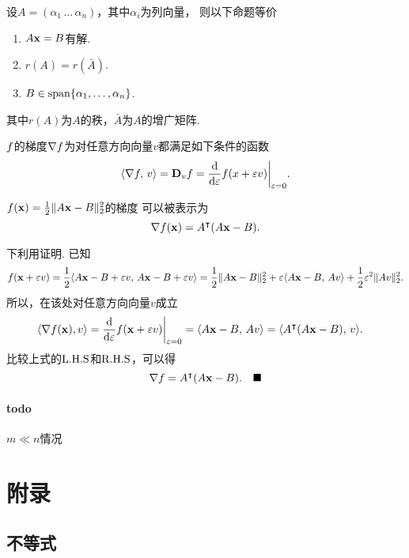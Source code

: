   \begin{thm}[可解性条件]
    设$A=(\alpha_1\,\dots\,\alpha_n)$，其中$\alpha_i$为列向量，
    则以下命题等价
    \begin{enumerate}
      \item $A\mathbf{x}=B$有解.
      \item $r(A) = r(\bar{A})$.
      \item $B\in\operatorname{span}\{\alpha_1,\dots,\alpha_n\}$.
    \end{enumerate}
    其中$r(A)$为$A$的秩，$\bar{A}$为$A$的增广矩阵.
  \end{thm}

  \begin{lemma}[梯度的定价定义]
    \label{lemma: 梯度的等价定义}
    $\mathnormal{f}$的梯度$\nabla\mathnormal{f}$为对任意方向向量$v$都满足如下条件的函数
    \[
      \langle\nabla\mathnormal{f},\,v\rangle = \textbf{D}_v\mathnormal{f} = \frac{\mathrm{d}}{\mathrm{d}\varepsilon}\mathnormal{f}(x+\varepsilon v)
      \bigg|_{\varepsilon=0}.
    \]
  \end{lemma}

  \begin{thm}
    $\mathnormal{f}(\mathbf{x}) = \frac{1}{2}\|A\mathbf{x}-B\|_2^2$的梯度
    可以被表示为
    \[
      \nabla\mathnormal{f}(\mathbf{x}) = A^\intercal(A\mathbf{x}-B).
    \]
  \end{thm}
  \proof
    下利用证明. 已知
    \[
      \mathnormal{f}(\textbf{x}+\varepsilon v) = \frac{1}{2}\langle A\mathbf{x}-B+\varepsilon v,\, A\mathbf{x}-B+\varepsilon v\rangle
      = \frac{1}{2}\|A\mathbf{x}-B\|_2^2 + \varepsilon\langle A\mathbf{x}-B,\,Av \rangle + \frac{1}{2}\varepsilon^2
      \|Av\|_2^2.
    \]
    所以，在该处对任意方向向量$v$成立
    \[\begin{split}
      &\langle\nabla\mathnormal{f}(\mathbf{x}),v\rangle = \frac{\mathrm{d}}{\mathrm{d}\varepsilon}\mathnormal{f}(\mathbf{x}+\varepsilon v)\bigg|_{\varepsilon=0}
      = \langle A\mathbf{x}-B,\,Av\rangle = \langle A^\intercal(A\mathbf{x}-B),\, v \rangle.
    \end{split}\]
    比较上式的$\text{L.H.S}$和$\text{R.H.S}$，可以得
    \[
      \nabla\mathnormal{f} = A^\intercal(A\mathbf{x}-B).\quad\blacksquare
    \]

  \paragraph{todo}
    $m \ll n$情况


\newpage
\section{附录}
\subsection{不等式}

